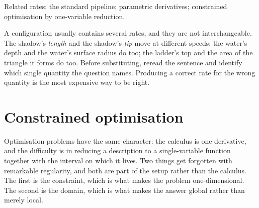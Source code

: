 \begin{seealsob}Related rates: the standard pipeline; parametric derivatives; constrained optimisation by one-variable reduction.\end{seealsob}

\begin{keynote}
A configuration usually contains several rates, and they are not interchangeable. The shadow's \emph{length} and the shadow's \emph{tip} move at different speeds; the water's depth and the water's surface radius do too; the ladder's top and the area of the triangle it forms do too. Before substituting, reread the sentence and identify which single quantity the question names. Producing a correct rate for the wrong quantity is the most expensive way to be right.
\end{keynote}

\section{Constrained optimisation}

Optimisation problems have the same character: the calculus is one derivative, and the difficulty is in reducing a description to a single-variable function together with the interval on which it lives. Two things get forgotten with remarkable regularity, and both are part of the setup rather than the calculus. The first is the constraint, which is what makes the problem one-dimensional. The second is the domain, which is what makes the answer global rather than merely local.


